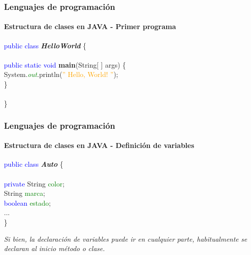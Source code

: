 \documentclass{beamer}
\begin{document}
		\begin{frame}
			\frametitle{Lenguajes de programaci\'on}
			\framesubtitle{Estructura de clases en JAVA - Primer programa}

			\begin{block}{}
				\textcolor{blue}{public class} \textbf{\emph{HelloWorld}} \{ \\
				\hspace{1cm} \\
				\hspace{1cm} \textcolor{blue}{public static void} \textbf{main}(String[ ] args) \{ \\
				\hspace{2cm} System.\emph{\textcolor{green}{out}}.println(\textcolor{orange}{'' Hello, World! ''}); \\
				\hspace{1cm} \} \\
				\hspace{1cm} \\
				\}
			\end{block}
		\end{frame}

		\begin{frame}
			\frametitle{Lenguajes de programaci\'on}
			\framesubtitle{Estructura de clases en JAVA - Definici\'on de variables}

			\begin{block}{}
				\textcolor{blue}{public class} \textbf{\emph{Auto}} \{ \\
				\hspace{1cm} \\
				\hspace{1cm} \textcolor{blue}{private} String \textcolor{green}{color}; \ \\
				\hspace{1cm} String \textcolor{green}{marca}; \ \\
				\hspace{1cm} \textcolor{blue}{boolean} \textcolor{green}{estado}; \ \\
				\hspace{1cm} ... \\
				\}
			\end{block}
			\begin{block}{}
			{\scriptsize
				\emph{Si bien, la declaraci\'on de variables puede ir en cualquier parte, habitualmente se declaran al inicio m\'etodo o clase.}
			}
			\end{block}
		\end{frame}
		
\end{document}

